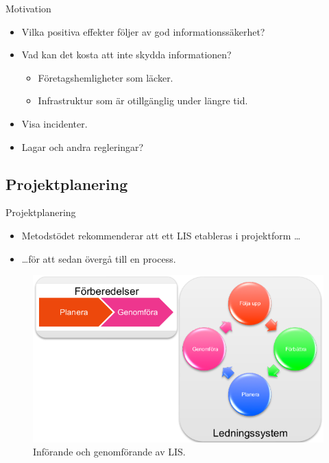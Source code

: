 \documentclass{beamer}
\begin{document}
\begin{frame}{Motivation}
  \begin{itemize}
    \item Vilka positiva effekter följer av god informationssäkerhet?

    \item Vad kan det kosta att inte skydda informationen?
      \begin{itemize}
        \item Företagshemligheter som läcker.
        \item Infrastruktur som är otillgänglig under längre tid.
      \end{itemize}

    \item Visa incidenter.

    \item Lagar och andra regleringar?

  \end{itemize}
\end{frame}

\subsection{Projektplanering}

\begin{frame}{Projektplanering}
  \begin{itemize}
    \item Metodstödet rekommenderar att ett LIS etableras i projektform \dots
    \item \dots för att sedan övergå till en process.
  \end{itemize}
  \begin{figure}
    \includegraphics[height=0.5\textheight]{lis.png}
    \caption{Införande och genomförande av LIS.}
  \end{figure}
\end{frame}
\end{document}
